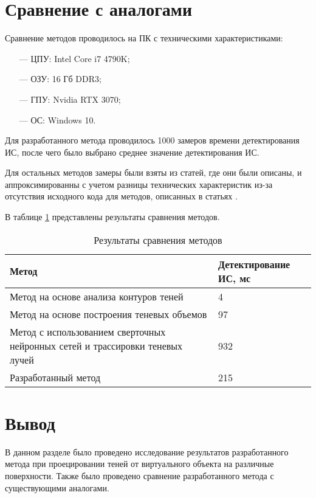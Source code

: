 \section{Сравнение с аналогами}

Сравнение методов проводилось на ПК с техническими характеристиками:

\begin{itemize}
	\item[---] ЦПУ: Intel Core i7 4790K;
	\item[---] ОЗУ: 16 Гб DDR3;
	\item[---] ГПУ: Nvidia RTX 3070;
	\item[---] ОС: Windows 10.
\end{itemize}

Для разработанного метода проводилось 1000 замеров времени детектирования ИС, после чего было выбрано среднее значение детектирования ИС.

Для остальных методов замеры были взяты из статей, где они были описаны, и аппроксимированны с учетом разницы технических характеристик из-за отсутствия исходного кода для методов, описанных в статьях \cite{shadow_contours_method} \cite{THOMASIAN2022385} \cite{sns_tras}.

В таблице \ref{CompareMethods} представлены результаты сравнения методов.

\begin{table}[H]
	\caption{Результаты сравнения методов}
	\label{CompareMethods}
	\begin{center}
		\begin{tabular}{| p{8 cm} | p{3.5 cm} |} 
			\hline
			Метод & Детектирование ИС, мс \\
			\hline
			Метод на основе анализа контуров теней & 4 \\
			\hline
			Метод на основе построения теневых объемов & 97 \\
			\hline
			Метод с использованием сверточных нейронных сетей и трассировки теневых лучей & 932 \\
			\hline
			Разработанный метод & 215 \\
			\hline
		\end{tabular}
	\end{center}
\end{table}

\section{Вывод}

В данном разделе было проведено исследование результатов разработанного метода при проецировании теней от виртуального объекта на различные поверхности. Также было проведено сравнение разработанного метода с существующими аналогами.

